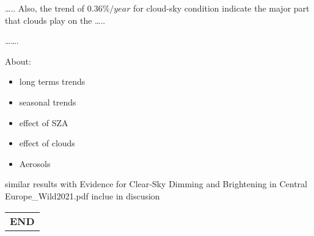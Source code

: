 \documentclass[preprint, 3p,
authoryear]{elsarticle} %
\begin{document}
\ldots.. Also, the trend of \(0.36\%/year\) for cloud-sky condition
indicate the major part that clouds play on the \ldots..

\ldots\ldots.

About:

\begin{itemize}
\item
  long terms trends
\item
  seasonal trends
\item
  effect of SZA
\item
  effect of clouds
\item
  Aerosols
\end{itemize}

similar results with Evidence for Clear‐Sky Dimming and Brightening in
Central Europe\_Wild2021.pdf inclue in discusion

\begin{longtable}[]{@{}c@{}}
\toprule\noalign{}
\endhead
\bottomrule\noalign{}
\endlastfoot
\textbf{END} \\
\end{longtable}


\end{document}
